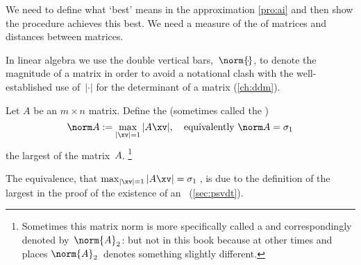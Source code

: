 We need to define what `best' means in the approximation \autoref{pro:ai} and then show the procedure achieves this best.
We need a measure of the  of matrices and distances between matrices.

In linear algebra we use the double vertical bars,~\(\norm{\cdot}\), to  denote the magnitude of a matrix in order to avoid a notational clash with the well-established use of~\(|\cdot|\) for the determinant of a matrix (\autoref{ch:ddm}).

\begin{definition} \label{def:norm} 
Let \(A\) be an \(m\times n\) matrix.  
Define the  (sometimes called the )
\begin{equation}
\norm A:=\max_{|\xv|=1}|A\xv|, 
\quad\text{equivalently }\norm A=\sigma_1
\label{eq:}
\end{equation}
the largest  of the matrix~\(A\).
\footnote{Sometimes this matrix norm is more specifically called a  and correspondingly denoted by~\(\norm{A}_2\): but not in this book because at other times and places \(\norm{A}_2\)~denotes something slightly different.}
\end{definition}
The equivalence, that \(\max_{|\xv|=1}|A\xv|=\sigma_1\)\,, is due to the definition of the largest  in the proof of the existence of an \svd\ (\autoref{sec:psvdt}).



